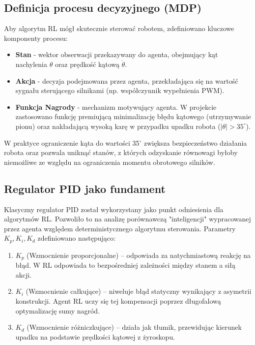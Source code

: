 \documentclass[12pt,twoside]{article}
\begin{document}
\subsection{Definicja procesu decyzyjnego (MDP)}
Aby algorytm RL mógł skutecznie sterować robotem, zdefiniowano kluczowe komponenty procesu:
\begin{itemize}
    \item \textbf{Stan} - wektor obserwacji przekazywany do agenta, obejmujący kąt nachylenia $\theta$ oraz prędkość kątową $\dot{\theta}$.
    \item \textbf{Akcja} - decyzja podejmowana przez agenta, przekładająca się na wartość sygnału sterującego silnikami (np. współczynnik wypełnienia PWM).
    \item \textbf{Funkcja Nagrody} - mechanizm motywujący agenta. W projekcie zastosowano funkcję premiującą minimalizację błędu kątowego (utrzymywanie pionu) oraz nakładającą wysoką karę w przypadku upadku robota ($|\theta| > 35^{\circ}$).
    
\end{itemize}
W praktyce ograniczenie kąta do wartości 35$^{\circ}$ zwiększa bezpieczeństwo działania robota oraz pozwala uniknąć stanów, z których odzyskanie równowagi byłoby niemożliwe ze względu na ograniczenia momentu obrotowego silników.

\subsection{Regulator PID jako fundament}
Klasyczny regulator PID został wykorzystany jako punkt odniesienia dla algorytmów RL. Pozwoliło to na analizę porównawczą "inteligencji" wypracowanej przez agenta względem deterministycznego algorytmu sterowania. Parametry $K_p, K_i, K_d$ zdefiniowano następująco:

\begin{enumerate}
    \item[-] $K_p$ (Wzmocnienie proporcjonalne) – odpowiada za natychmiastową reakcję na błąd. W RL odpowiada to bezpośredniej zależności między stanem a siłą akcji.
    \item[-] $K_i$ (Wzmocnienie całkujące) – niweluje błąd statyczny wynikający z asymetrii konstrukcji. Agent RL uczy się tej kompensacji poprzez długofalową optymalizację sumy nagród.
    \item[-] $K_d$ (Wzmocnienie różniczkujące) – działa jak tłumik, przewidując kierunek upadku na podstawie prędkości kątowej z żyroskopu.
\end{enumerate}
\end{document}
